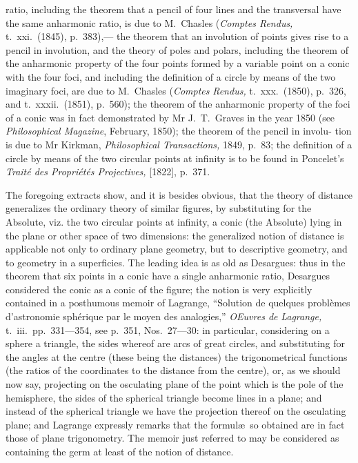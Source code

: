 \documentclass[11pt,a4paper]{article}
\begin{document}
ratio, including the theorem that a pencil of four lines and the transversal have the
same anharmonic ratio, is due to M.~Chasles (\textit{Comptes Rendus,} t.~xxi.\ (1845), p.~383),---
the theorem that an involution of points gives rise to a pencil in involution, and the
theory of poles and polars, including the theorem of the anharmonic property of the
four points formed by a variable point on a conic with the four foci, and including the
definition of a circle by means of the two imaginary foci, are due to M.~Chasles (\textit{Comptes}
\textit{Rendus,} t.~xxx.\ (1850), p.~326, and t.~xxxii.\ (1851), p.~560); the theorem of the anharmonic
property of the foci of a conic was in fact demonstrated by Mr J.~T.~Graves in the year
1850 (see \textit{Philosophical Magazine}, February, 1850); the theorem of the pencil in involu-
tion is due to Mr Kirkman, \textit{Philosophical Transactions,} 1849, p.~83; the definition of a
circle by means of the two circular points at infinity is to be found in Poncelet's
\textit{Trait\'{e} des Propri\'{e}t\'{e}s Projectives,} [1822], p.~371.

The foregoing extracts show, and it is besides obvious, that the theory of distance
generalizes the ordinary theory of similar figures, by substituting for the Absolute, viz.
the two circular points at infinity, a conic (the Absolute) lying in the plane or other
space of two dimensions: the generalized notion of distance is applicable not only to
ordinary plane geometry, but to descriptive geometry, and to geometry in a superficies.
The leading idea is as old as Desargues: thus in the theorem that six points in a conic
have a single anharmonic ratio, Desargues considered the conic as a conic of the figure;
the notion is very explicitly contained in a posthumous memoir of Lagrange, ``Solution
de quelques probl\`{e}mes d'astronomie sph\'{e}rique par le moyen des analogies,'' \textit{OEuvres de}
\textit{Lagrange,} t.~iii.\ pp.~331---354, see p.~351, Nos.~27---30: in particular, considering on a
sphere a triangle, the sides whereof are arcs of great circles, and substituting for the
angles at the centre (these being the distances) the trigonometrical functions (the ratios
of the coordinates to the distance from the centre), or, as we should now say, projecting
on the osculating plane of the point which is the pole of the hemisphere, the sides of the
spherical triangle become lines in a plane; and instead of the spherical triangle we have
the projection thereof on the osculating plane; and Lagrange expressly remarks that the
formul\ae\ so obtained are in fact those of plane trigonometry. The memoir just referred
to may be considered as containing the germ at least of the notion of distance.
\end{document}
